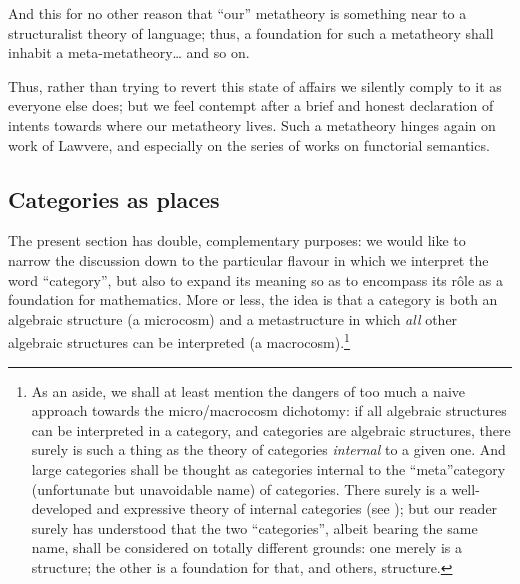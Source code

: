 And this for no other reason that ``our'' metatheory is something near to a structuralist theory of language; thus, a foundation for such a metatheory shall inhabit a meta-metatheory\dots{} and so on.

Thus, rather than trying to revert this state of affairs we silently comply to it as everyone else does; but we feel contempt after a brief and honest declaration of intents towards where our metatheory lives. Such a metatheory hinges again on work of Lawvere, and especially on the series of works on functorial semantics.
\subsection{Categories as places}\label{as_places}
The present section has double, complementary purposes: we would like to narrow the discussion down to the particular flavour in which we interpret the word ``category'', but also to expand its meaning so as to encompass its r\^ole as a foundation for mathematics. More or less, the idea is that a category is both an algebraic structure (a microcosm) and a metastructure in which \emph{all} other algebraic structures can be interpreted (a macrocosm).\footnote{As an aside, we shall at least mention the dangers of too much a naive approach towards the micro/macrocosm dichotomy: if all algebraic structures can be interpreted in a category, and categories are algebraic structures, there surely is such a thing as the theory of categories \emph{internal} to a given one. And large categories shall be thought as categories internal to the ``meta''category (unfortunate but unavoidable name) of categories. There surely is a well-developed and expressive theory of internal categories (see \cite{internalcat,reference}); but our reader surely has understood that the two ``categories'', albeit bearing the same name, shall be considered on totally different grounds: one merely is a structure; the other is a foundation for that, and others, structure.}

